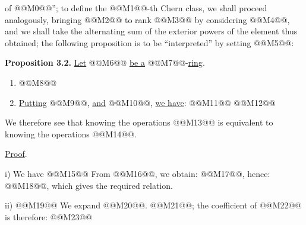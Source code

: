 of @@M0@@'';
to define the @@M1@@-th Chern class, we shall proceed analogously, bringing @@M2@@ to rank @@M3@@ by considering @@M4@@, and we shall take the alternating sum of the exterior powers of the element thus obtained; the following proposition is to be ``interpreted'' by setting @@M5@@:

\textbf{Proposition 3.2.} \uline{Let} @@M6@@ \uline{be a} @@M7@@-\uline{ring}.
\begin{enumerate}[label=\roman*)]
\item @@M8@@
\item \uline{Putting} @@M9@@, \uline{and} @@M10@@, \uline{we have}:
@@M11@@
@@M12@@
\end{enumerate}

We therefore see that knowing the operations @@M13@@ is equivalent to knowing the operations @@M14@@.

\uline{Proof}.

i) We have
@@M15@@
From @@M16@@, we obtain: @@M17@@, hence: @@M18@@, which gives the required relation.

ii) @@M19@@
We expand @@M20@@. @@M21@@; the coefficient of @@M22@@ is therefore:
@@M23@@


